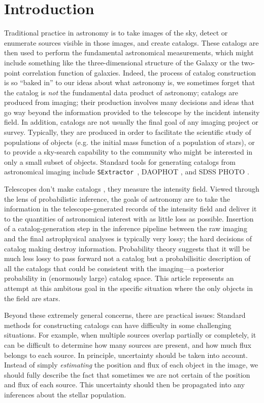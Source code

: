 \documentclass[12pt, preprint]{aastex}
\newcommand{\sex}{{\tt SExtractor}}
\begin{document}
\section{Introduction}
Traditional practice in astronomy is to take images of the sky, detect
or enumerate sources visible in those images, and create catalogs.
These catalogs are then used to perform the fundamental astronomical
measurements, which might include something like the three-dimensional
structure of the Galaxy or the two-point correlation function of
galaxies.  Indeed, the process of catalog construction is so ``baked
in'' to our ideas about what astronomy is, we sometimes forget that
the catalog is \emph{not} the fundamental data product of astronomy; catalogs are produced
from imaging; their production involves many decisions and ideas
that go way beyond the information provided to the telescope by the
incident intensity field. In addition, catalogs are not usually the final
goal of any imaging project or survey. Typically, they are produced in
order to facilitate the scientific study of populations of objects (e.g. the
initial mass function of a population of stars), or to provide a sky-search
capability to the community who might be interested in only a small subset of
objects. Standard tools for generating catalogs from astronomical imaging
include \sex~\citep{sextractor}, DAOPHOT \citep{1987PASP...99..191S}, and SDSS
PHOTO \citep{photo}.

Telescopes don't make catalogs \citep{2011EAS....45..351H}, they
measure the intensity field.  Viewed through the lens of probabilistic
inference, the goals of astronomy are to take the information in the
telescope-generated records of the intensity field and deliver it to
the quantities of astronomical interest with as little loss as
possible.  Insertion of a catalog-generation step in the inference
pipeline between the raw imaging and the final astrophysical analyses
is typically very lossy; the hard decisions of catalog making destroy
information.  Probability theory suggests that it will be much less
lossy to pass forward not a catalog but a probabilisitic
description of all the catalogs that could be consistent with the
imaging---a posterior probability in (enormously large) catalog space.
This article represents an attempt at this ambitous goal in the specific
situation where the only objects in the field are stars.

Beyond these extremely general concerns, there are practical issues:
Standard methods for constructing catalogs can have difficulty in some
challenging situations. For example, when multiple sources overlap partially
or completely, it can be difficult to determine how many sources are present,
and how much flux belongs to each source. In principle, uncertainty should be
taken into account. Instead of simply {\it estimating} the position and flux of
each object in the image, we should fully describe the fact that sometimes we
are not certain of the position and flux of each source. This uncertainty
should then be propagated into any inferences about the stellar population.
\end{document}
